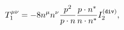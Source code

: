 \begin{equation}
T_1^{\mu\nu} = -8n^\mu n^\nu \frac{p^2}{p\cdot n}\frac{p\cdot n^*}{n\cdot n^*}I_2^{(\tt div)},
\end{equation}

